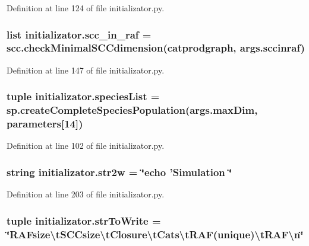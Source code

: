 Definition at line 124 of file initializator.\+py.

\hypertarget{a00137_a528fd8494c795cfcb3810626c84ae291}{
\subsubsection[{scc\+\_\+in\+\_\+raf}]{\setlength{\rightskip}{0pt plus 5cm}list initializator.\+scc\+\_\+in\+\_\+raf = scc.\+check\+Minimal\+S\+C\+Cdimension({\bf catprodgraph}, args.\+sccinraf)}}\label{a00137_a528fd8494c795cfcb3810626c84ae291}


Definition at line 147 of file initializator.\+py.

\hypertarget{a00137_a79af2b1d3fe38f2cd259cc56b1ecc5f3}{
\subsubsection[{species\+List}]{\setlength{\rightskip}{0pt plus 5cm}tuple initializator.\+species\+List = sp.\+create\+Complete\+Species\+Population(args.\+max\+Dim, {\bf parameters}\mbox{[}14\mbox{]})}}\label{a00137_a79af2b1d3fe38f2cd259cc56b1ecc5f3}


Definition at line 102 of file initializator.\+py.

\hypertarget{a00137_ae18cfdf290fd3edf979ab55e9dbb65c7}{
\subsubsection[{str2w}]{\setlength{\rightskip}{0pt plus 5cm}string initializator.\+str2w = \char`\"{}echo 'Simulation \char`\"{}}}\label{a00137_ae18cfdf290fd3edf979ab55e9dbb65c7}


Definition at line 203 of file initializator.\+py.

\hypertarget{a00137_a2425798997b1c46c8bbed77ecffcaa9f}{
\subsubsection[{str\+To\+Write}]{\setlength{\rightskip}{0pt plus 5cm}tuple initializator.\+str\+To\+Write = \char`\"{}R\+A\+Fsize\textbackslash{}t\+S\+C\+Csize\textbackslash{}t\+Closure\textbackslash{}t\+Cats\textbackslash{}t\+R\+A\+F(unique)\textbackslash{}t\+R\+A\+F\textbackslash{}n\char`\"{}}}\label{a00137_a2425798997b1c46c8bbed77ecffcaa9f}



